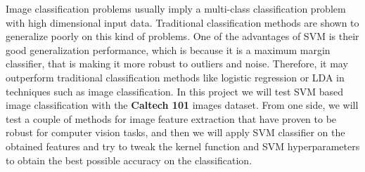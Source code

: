 Image classification problems usually imply a multi-class classification problem with high dimensional input data. Traditional classification methods are shown to generalize poorly on this kind of problems. One of the advantages of SVM is their good generalization performance, which is because it is a maximum margin classifier, that is making it more robust to outliers and noise. Therefore, it may outperform traditional classification methods like logistic regression or LDA in techniques such as image classification. In this project we will test SVM based image classification with the \textbf{Caltech 101}\cite{LiFergusPerona04} images dataset. From one side, we will test a couple of methods for image feature extraction that have proven to be robust for computer vision tasks, and then we will apply SVM classifier on the obtained features and try to tweak the kernel function and SVM hyperparameters to obtain the best possible accuracy on the classification.
